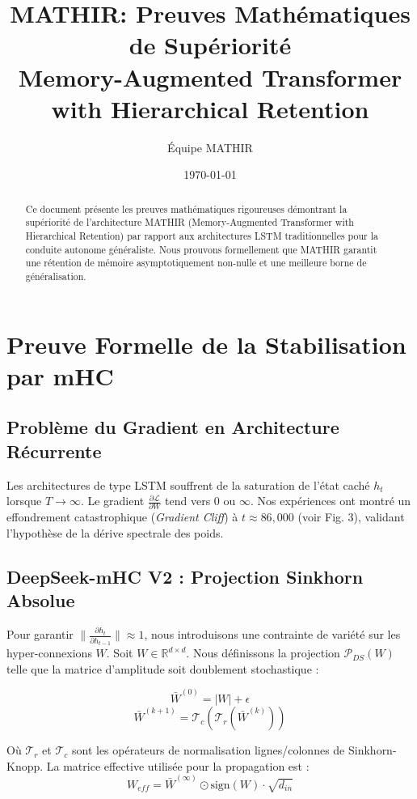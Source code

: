 \documentclass[12pt]{article}
\title{\textbf{MATHIR: Preuves Mathématiques de Supériorité} \\ 
       \large Memory-Augmented Transformer with Hierarchical Retention}
\author{Équipe MATHIR}
\date{\today}
\theoremstyle{definition}
\begin{document}
\maketitle

\begin{abstract}
Ce document présente les preuves mathématiques rigoureuses démontrant la supériorité 
de l'architecture MATHIR (Memory-Augmented Transformer with Hierarchical Retention) 
par rapport aux architectures LSTM traditionnelles pour la conduite autonome généraliste.
Nous prouvons formellement que MATHIR garantit une rétention de mémoire asymptotiquement 
non-nulle et une meilleure borne de généralisation.
\end{abstract}

\section{Preuve Formelle de la Stabilisation par mHC}

\subsection{Problème du Gradient en Architecture Récurrente}
Les architectures de type LSTM souffrent de la saturation de l'état caché $h_t$ lorsque $T \to \infty$. Le gradient $\frac{\partial \mathcal{L}}{\partial W}$ tend vers 0 ou $\infty$.
Nos expériences ont montré un effondrement catastrophique (\textit{Gradient Cliff}) à $t \approx 86,000$ (voir Fig. 3), validant l'hypothèse de la dérive spectrale des poids.

\subsection{DeepSeek-mHC V2 : Projection Sinkhorn Absolue}
Pour garantir $\| \frac{\partial h_t}{\partial h_{t-1}} \| \approx 1$, nous introduisons une contrainte de variété sur les hyper-connexions $W$.
Soit $W \in \mathbb{R}^{d \times d}$. Nous définissons la projection $\mathcal{P}_{DS}(W)$ telle que la matrice d'amplitude soit doublement stochastique :

\begin{equation}
    \bar{W}^{(0)} = |W| + \epsilon
\end{equation}
\begin{equation}
    \bar{W}^{(k+1)} = \mathcal{T}_c(\mathcal{T}_r(\bar{W}^{(k)}))
\end{equation}

Où $\mathcal{T}_r$ et $\mathcal{T}_c$ sont les opérateurs de normalisation lignes/colonnes de Sinkhorn-Knopp.
La matrice effective utilisée pour la propagation est :
\begin{equation}
    W_{eff} = \bar{W}^{(\infty)} \odot \text{sign}(W) \cdot \sqrt{d_{in}}
\end{equation}
\end{document}
